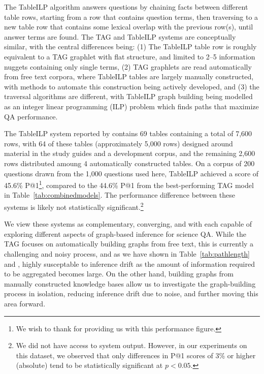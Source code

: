 The TableILP algorithm answers questions by chaining facts between different table rows, starting from a row that contains question terms, then traversing to a new table row that contains some lexical overlap with the previous row(s), until answer terms are found.  The TAG and TableILP systems are conceptually similar, with the central differences being: (1) The TableILP table row is roughly equivalent to a TAG graphlet with flat structure, and limited to 2--5 information nuggets containing only single terms, (2) TAG graphlets are read automatically from free text corpora, where TableILP tables are largely manually constructed, with methods to automate this construction being actively developed, and (3) the traversal algorithms are different, with TableILP graph building being modelled as an integer linear programming (ILP) problem which finds paths that maximize QA performance.  

The TableILP system reported by \citet{Khashabi2016QuestionAV} contains 69 tables containing a total of 7,600 rows, with 64 of these tables (approximately 5,000 rows) designed around material in the study guides and a development corpus, and the remaining 2,600 rows distributed amoung 4 automatically constructed tables.  On a corpus of 200 questions drawn from the 1,000 questions used here, TableILP achieved a score of 45.6\% P@1\footnote{We wish to thank \citet{Khashabi2016QuestionAV} for providing us with this performance figure.}, compared to the 44.6\% P@1 from the best-performing TAG model in Table~\ref{tab:combinedmodels}. The performance difference between these systems is likely not statistically significant.\footnote{We did not have access to system output. However, in our experiments on this dataset, we observed that only differences in P@1 scores of 3\% or higher (absolute) tend to be statistically significant at $p < 0.05$.}

We view these systems as complementary, converging, and with each capable of exploring different aspects of graph-based inference for science QA.  While the TAG focuses on automatically building graphs from free text, this is currently a challenging and noisy process, and as we have shown in Table~\ref{tab:pathlength} and \citet{fried2015higher}, highly susceptable to inference drift as the amount of information required to be aggregated becomes large.  On the other hand, building graphs from manually constructed knowledge bases allow us to investigate the graph-building process in isolation, reducing inference drift due to noise, and further moving this area forward.  

